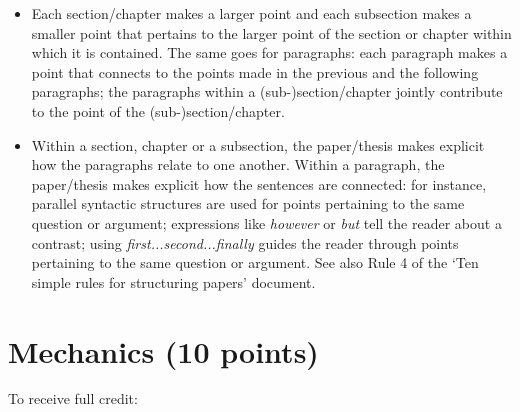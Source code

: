 \documentclass[11pt,fleqn,a4paper/thesis]{article}
\newcommand{\6}{\mbox{$[\hspace*{-.6mm}[$}}
\newcommand{\9}{\mbox{$]\hspace*{-.6mm}]$}}
\begin{document}
\begin{itemize}[itemsep=-1pt,leftmargin=2.5ex,topsep=-2pt]
\item Each section/chapter makes a larger point and each subsection makes a smaller point that pertains to the larger point of the section or chapter within
which it is contained. The same goes for paragraphs: each paragraph makes a point that connects to the points made in the previous and the following
paragraphs; the paragraphs within a (sub-)section/chapter jointly contribute to the point of the (sub-)section/chapter.

\item Within a section, chapter or a subsection, the paper/thesis makes explicit how the paragraphs relate to one another. Within a paragraph, the paper/thesis makes explicit how the sentences are connected: for instance, parallel syntactic structures are used for points pertaining to the same question or argument; expressions like {\em however} or {\em but} tell the reader about a contrast; using {\em first...second...finally} guides the reader through points pertaining to the same question or argument. See also Rule 4 of the `Ten simple rules for structuring papers' document.

\end{itemize}

\section{Mechanics (10 points)}

To receive full credit:
\end{document}
